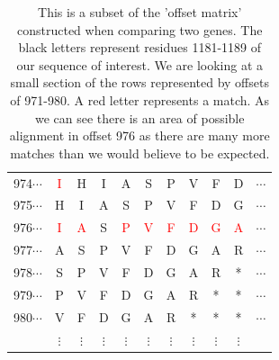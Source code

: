 \documentclass[phd,tocprelim]{cornell}
\begin{document}
\begin{table}[htp]
\begin{center}
{\begin{tabular}{|ccccccccccc|}
\small{974}$\cdots$ & \textcolor{red}{I} & H & I & A & S & P & V & F & D & $\cdots$ \\                                                                 
\small{975}$\cdots$ & H & I & A & S & P & V & F & D & G & $\cdots$ \\
\small{976}$\cdots$ & \textcolor{red}{I} & \textcolor{red}{A} & S & \textcolor{red}{P} & \textcolor{red}{V} & \textcolor{red}{F} & \textcolor{red}{D} & \textcolor{red}{G} & \textcolor{red}{A} &  $\cdots$ \\
\small{977}$\cdots$ & A & S & P & V & F & D & G & A & R & $\cdots$ \\
\small{978}$\cdots$ & S & P & V & F & D & G & A & R & * & $\cdots$ \\
\small{979}$\cdots$ & P & V & F & D & G & A & R & * & * & $\cdots$ \\
\small{980}$\cdots$ & V & F & D & G & A & R & * & * & * & $\cdots$ \\
 & $\vdots$ &  $\vdots$ &  $\vdots$ &  $\vdots$ & $\vdots$ &  $\vdots$ &  $\vdots$ &  $\vdots$&  $\vdots$ & \\
\hline
\end{tabular}
}
\end{center}
\caption[Velvetrope offset matrix]{This is a subset of the 'offset matrix' constructed when comparing two genes. The black letters represent residues 1181-1189 of our sequence of interest. We are looking at a small section of the rows represented by offsets of 971-980. A red letter represents a match. As we can see there is an area of possible alignment in offset 976 as there are many more matches than we would believe to be expected.}
\end{table}
\end{document}
